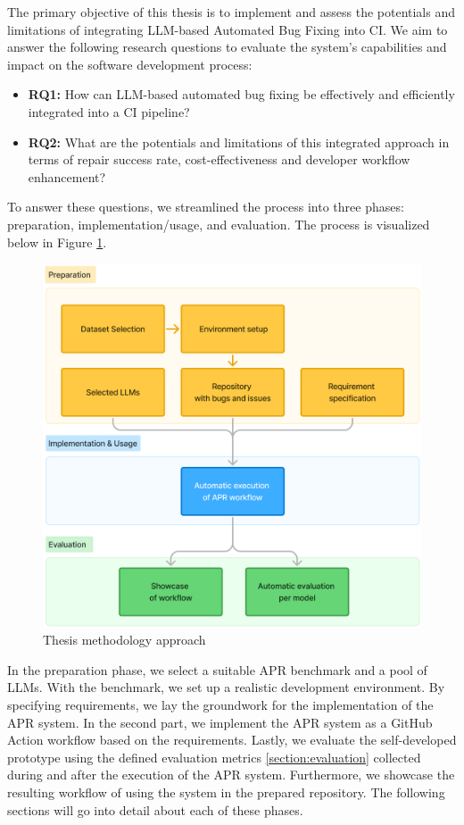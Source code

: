 The primary objective of this thesis is to implement and assess the potentials and limitations of integrating LLM-based Automated Bug Fixing into \acf{CI}. We aim to answer the following research questions to evaluate the system's capabilities and impact on the software development process:

\begin{itemize}
    \item \textbf{RQ1:} How can LLM-based automated bug fixing be effectively and efficiently integrated into a \ac{CI} pipeline?
    \item \textbf{RQ2:} What are the potentials and limitations of this integrated approach in terms of repair success rate, cost-effectiveness and developer workflow enhancement?
\end{itemize}

To answer these questions, we streamlined the process into three phases: preparation, implementation/usage, and evaluation. The process is visualized below in Figure \ref{fig:method-overview}.

\begin{figure}[H]
    \centering
    \includegraphics[width=1\textwidth]{images/flowcharts/method.png}
    \caption{Thesis methodology approach}
    \label{fig:method-overview}
\end{figure}

In the preparation phase, we select a suitable APR benchmark and a pool of \acp{LLM}. With the benchmark, we set up a realistic development environment. By specifying requirements, we lay the groundwork for the implementation of the APR system.
In the second part, we implement the APR system as a GitHub Action workflow based on the requirements.
Lastly, we evaluate the self-developed prototype using the defined evaluation metrics \ref{section:evaluation} collected during and after the execution of the APR system. Furthermore, we showcase the resulting workflow of using the system in the prepared repository.
The following sections will go into detail about each of these phases.

